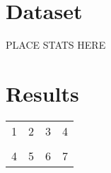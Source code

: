 \documentclass{article}%
\begin{document}
%
\normalsize%
\section{Dataset}%
\label{sec:Dataset}%
PLACE STATS HERE

%
\section{Results}%
\label{sec:Results}%
\begin{tabular}{rc|cl}%
\hline%
1&2&3&4\\%
&&&\\%
4&5&6&7\\%
\end{tabular}

%
\end{document}
